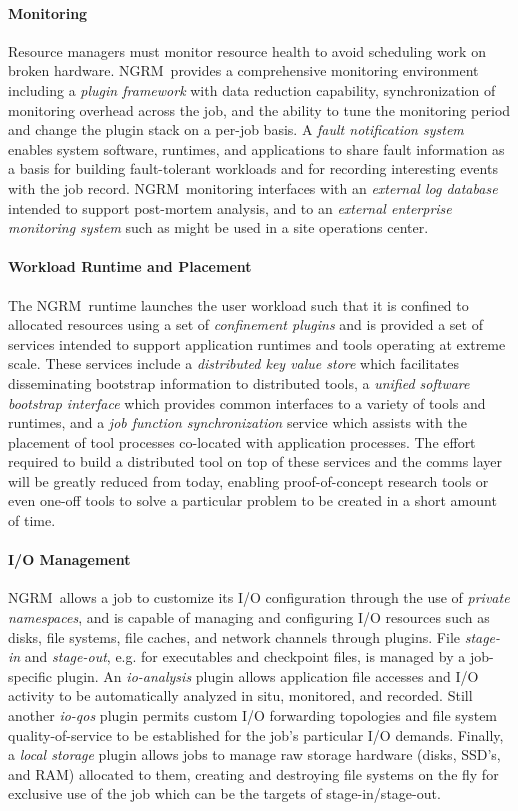 \documentclass{article}
\newcommand{\ngrm}{NGRM}
\begin{document}
\paragraph{Monitoring}
Resource managers must monitor resource health to avoid scheduling
work on broken hardware.  \ngrm\ provides a comprehensive monitoring
environment including a {\em plugin framework} with data reduction
capability, synchronization of monitoring overhead across the job,
and the ability to tune the monitoring period and change the plugin
stack on a per-job basis.
A {\em fault notification system} enables system software, runtimes, and
applications to share fault information as a basis for building fault-tolerant
workloads and for recording interesting events with the job record.
\ngrm\ monitoring interfaces with an {\em external log database} intended
to support post-mortem analysis, and to
an {\em external enterprise monitoring system} such as might be used in
a site operations center.

\paragraph{Workload Runtime and Placement}
The \ngrm\ runtime launches the user workload such that it is confined
to allocated resources using a set of {\em confinement plugins}
and is provided a set of services intended to support application
runtimes and tools operating at extreme scale.
These services include a {\em distributed key value store} which facilitates
disseminating bootstrap information to distributed tools,
a {\em unified software bootstrap interface} which provides common
interfaces to a variety of tools and runtimes, and
a {\em job function synchronization} service which assists with the placement
of tool processes co-located with application processes.
The effort required to build a distributed tool on top of these services
and the comms layer will be greatly reduced from today, enabling
proof-of-concept research tools or even one-off tools to solve a particular
problem to be created in a short amount of time.

\paragraph{I/O Management}
\ngrm\ allows a job to customize its I/O configuration through the use
of {\em private namespaces}, and is capable of managing and configuring
I/O resources such as disks, file systems, file caches, and network channels
through plugins.
File {\em stage-in} and {\em stage-out}, e.g. for executables and
checkpoint files, is managed by a job-specific plugin.
An {\em io-analysis} plugin allows application file accesses and
I/O activity to be automatically analyzed in situ, monitored, and recorded.
Still another {\em io-qos} plugin permits custom I/O forwarding topologies
and file system quality-of-service to be established for the job's
particular I/O demands.  Finally, a  {\em local storage} plugin allows
jobs to manage raw storage hardware (disks, SSD's, and RAM) allocated
to them, creating and destroying file systems on the fly for exclusive
use of the job which can be the targets of stage-in/stage-out.
\end{document}
